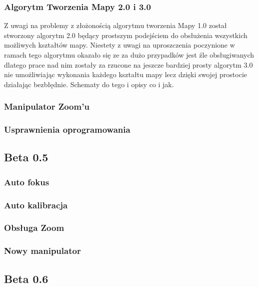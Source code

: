 \documentclass[11pt,a4paper]{article}
\begin{document}
    \subsubsection{Algorytm Tworzenia Mapy 2.0 i 3.0}
    \hspace{1cm} Z uwagi na problemy z złożonością algorytmu tworzenia Mapy 1.0 został stworzony algorytm 2.0 będący prostszym podejściem do obsłużenia wszystkich możliwych kształtów mapy. Niestety z uwagi na uproszczenia poczynione w ramach tego algorytmu okazało się ze za dużo przypadków jest źle obsługiwanych dlatego prace nad nim zostały za rzucone na jeszcze bardziej prosty algorytm 3.0 nie umożliwiając wykonania każdego kształtu mapy lecz dzięki swojej prostocie działając bezbłędnie.
            {\color{red} Schematy do tego i opisy co i jak.}

    \subsubsection{Manipulator Zoom'u}

    \subsubsection{Usprawnienia oprogramowania}

    \subsection{Beta 0.5}

    \subsubsection{Auto fokus}

    \subsubsection{Auto kalibracja}

    \subsubsection{Obsługa Zoom}

    \subsubsection{Nowy manipulator}

    \subsection{Beta 0.6}
\end{document}
